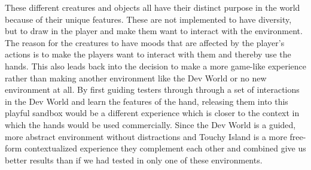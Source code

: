 These different creatures and objects all have their distinct purpose in the world because of their unique features. These are not implemented to have diversity, but to draw in the player and make them want to interact with the environment. The reason for the creatures to have moods that are affected by the player's actions is to make the players want to interact with them and thereby use the hands. This also leads back into the decision to make a more game-like experience rather than making another environment like the Dev World or no new environment at all. By first guiding testers through through a set of interactions in the Dev World and learn the features of the hand, releasing them into this playful sandbox would be a different experience which is closer to the context in which the hands would be used commercially. Since the Dev World is a guided, more abstract environment without distractions and Touchy Island is a more free-form contextualized experience they complement each other and combined give us better results than if we had tested in only one of these environments.
